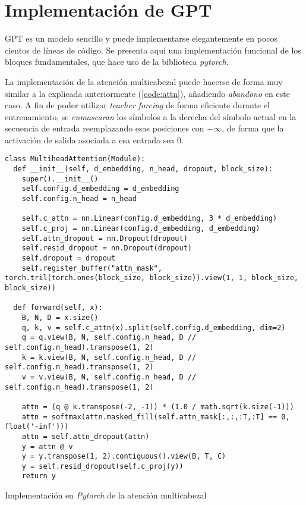 \chapter{Implementación de GPT} \label{appendixA}
GPT es un modelo sencillo y puede implementarse elegantemente en pocos cientos de líneas de código. Se presenta aquí una implementación funcional de los bloques fundamentales, que hace uso de la biblioteca \textit{pytorch}.

La implementación de la atención multicabezal puede hacerse de forma muy similar a la explicada anteriormente (\cref{code:attn}), añadiendo \textit{abandono} en este caso. A fin de poder utilizar \textit{teacher forcing} de forma eficiente durante el entrenamiento, se \textit{enmascaran} los símbolos a la derecha del símbolo actual en la secuencia de entrada reemplazando esas posiciones con \( -\infty \), de forma que la activación de salida asociada a esa entrada sea \( 0 \).

\begin{code}
\begin{verbatim}
class MultiheadAttention(Module):
  def __init__(self, d_embedding, n_head, dropout, block_size):
    super().__init__()
    self.config.d_embedding = d_embedding
    self.config.n_head = n_head

    self.c_attn = nn.Linear(config.d_embedding, 3 * d_embedding)
    self.c_proj = nn.Linear(config.d_embedding, d_embedding)
    self.attn_dropout = nn.Dropout(dropout)
    self.resid_dropout = nn.Dropout(dropout)
    self.dropout = dropout
    self.register_buffer("attn_mask", torch.tril(torch.ones(block_size, block_size)).view(1, 1, block_size, block_size))

  def forward(self, x):
    B, N, D = x.size()
    q, k, v = self.c_attn(x).split(self.config.d_embedding, dim=2)
    q = q.view(B, N, self.config.n_head, D // self.config.n_head).transpose(1, 2)
    k = k.view(B, N, self.config.n_head, D // self.config.n_head).transpose(1, 2)
    v = v.view(B, N, self.config.n_head, D // self.config.n_head).transpose(1, 2)

    attn = (q @ k.transpose(-2, -1)) * (1.0 / math.sqrt(k.size(-1)))
    attn = softmax(attn.masked_fill(self.attn_mask[:,:,:T,:T] == 0, float('-inf')))
    attn = self.attn_dropout(attn)
    y = attn @ v
    y = y.transpose(1, 2).contiguous().view(B, T, C)
    y = self.resid_dropout(self.c_proj(y))
    return y
\end{verbatim}
\caption{Implementación en \textit{Pytorch} de la atención multicabezal}
\label{code:attn}
\end{code}

